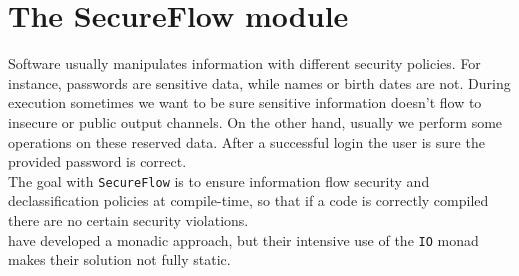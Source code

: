 \section{The SecureFlow module}\label{sec:flow}
Software usually manipulates information with different security policies. For instance, passwords are sensitive data, while names or birth dates are not. During execution sometimes we want to be sure sensitive information doesn't flow to insecure or public output channels. On the other hand, usually we perform some operations on these reserved data. After a successful login the user is sure the provided password is correct. \\
The goal with \texttt{SecureFlow} is to ensure information flow security and declassification policies at compile-time, so that if a code is correctly compiled there are no certain security violations. \\
\citeauthor{russo2008library} \cite{russo2008library} have developed a monadic approach, but their intensive use of the \texttt{IO} monad makes their solution not fully static.

